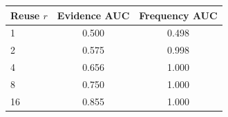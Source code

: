 \begin{tabular}{lcc}
\toprule
Reuse $r$ & Evidence AUC & Frequency AUC \\
\midrule
1 & 0.500 & 0.498 \\
2 & 0.575 & 0.998 \\
4 & 0.656 & 1.000 \\
8 & 0.750 & 1.000 \\
16 & 0.855 & 1.000 \\
\bottomrule
\end{tabular}
